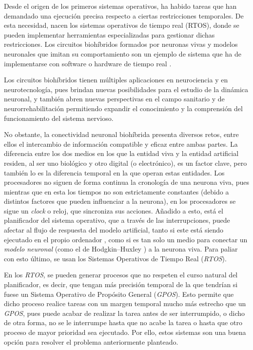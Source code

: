 
Desde el origen de los primeros sistemas operativos, ha habido tareas que han demandado una ejecución precisa respecto a ciertas restricciones temporales. De esta necesidad, nacen los sistemas operativos de tiempo real (RTOS), donde se pueden implementar herramientas especializadas para gestionar dichas restricciones. Los circuitos biohíbridos formados por neuronas vivas y modelos neuronales que imitan su comportamiento son un ejemplo de sistema que ha de implementarse con software o hardware de tiempo real \cite{Amaducci2019,Amaducci2022}.

Los circuitos biohíbridos tienen múltiples aplicaciones en neurociencia y en neurotecnología, pues brindan nuevas posibilidades para el estudio de la dinámica neuronal, y también abren nuevas perspectivas en el campo sanitario y de neurorrehabilitación permitiendo expandir el conocimiento y la comprensión del funcionamiento del sistema nervioso. 

No obstante, la conectividad neuronal biohíbrida presenta diversos retos, entre ellos el intercambio de información compatible y eficaz entre ambas partes. La diferencia entre los dos medios en los que la entidad viva y la entidad artificial residen, al ser uno biológico y otro digital (o electrónico), es un factor clave, pero también lo es la diferencia temporal en la que operan estas entidades. Los procesadores no siguen de forma continua la cronología de una neurona viva, pues mientras que en esta los tiempos no son estrictamente constantes (debido a distintos factores que pueden influenciar a la neurona), en los procesadores se sigue un \textit{clock} o reloj, que sincroniza sus acciones. Añadido a esto, está el planificador del sistema operativo, que a través de las interrupciones, puede afectar al flujo de respuesta del modelo artificial, tanto si este está siendo ejecutado en el propio ordenador  \cite{Amaducci2019, Cerqueira2013}, como si es tan solo un medio para conectar un \textit{modelo neuronal} (como el de Hodgkin–Huxley \cite{Hodgkin1990}) a la neurona viva. Para paliar con esto último, se usan los Sistemas Operativos de Tiempo Real (\textit{RTOS}).

En los \textit{RTOS}, se pueden generar procesos que no respeten el curso natural del planificador, es decir, que tengan más precisión temporal de la que tendrían si fuese un Sistema Operativo de Propósito General (\textit{GPOS}). Esto permite que dicho proceso realice tareas con un margen temporal mucho más estrecho que un \textit{GPOS}, pues puede acabar de realizar la tarea antes de ser interrumpido, o dicho de otra forma, no se le interrumpe hasta que no acabe la tarea o hasta que otro proceso de mayor prioridad sea ejecutado. Por ello, estos sistemas son una buena opción para resolver el problema anteriormente planteado. 

